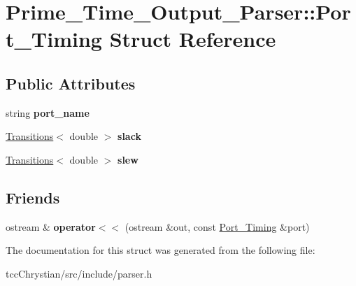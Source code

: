 \hypertarget{structPrime__Time__Output__Parser_1_1Port__Timing}{\section{Prime\-\_\-\-Time\-\_\-\-Output\-\_\-\-Parser\-:\-:Port\-\_\-\-Timing Struct Reference}
\label{structPrime__Time__Output__Parser_1_1Port__Timing}
}
\subsection*{Public Attributes}
\begin{DoxyCompactItemize}
\item 
\hypertarget{structPrime__Time__Output__Parser_1_1Port__Timing_a4c7ae6cb0e76db94fe3b03822ead72c4}{string {\bfseries port\-\_\-name}}\label{structPrime__Time__Output__Parser_1_1Port__Timing_a4c7ae6cb0e76db94fe3b03822ead72c4}

\item 
\hypertarget{structPrime__Time__Output__Parser_1_1Port__Timing_a21231dfc490477789c81e0c9e3e8c18d}{\hyperlink{classTransitions}{Transitions}$<$ double $>$ {\bfseries slack}}\label{structPrime__Time__Output__Parser_1_1Port__Timing_a21231dfc490477789c81e0c9e3e8c18d}

\item 
\hypertarget{structPrime__Time__Output__Parser_1_1Port__Timing_a33e7eb34b63367e3b639999e1cb793bf}{\hyperlink{classTransitions}{Transitions}$<$ double $>$ {\bfseries slew}}\label{structPrime__Time__Output__Parser_1_1Port__Timing_a33e7eb34b63367e3b639999e1cb793bf}

\end{DoxyCompactItemize}
\subsection*{Friends}
\begin{DoxyCompactItemize}
\item 
\hypertarget{structPrime__Time__Output__Parser_1_1Port__Timing_abd555e7dc2c5bfe2b1699915d6b0ca8f}{ostream \& {\bfseries operator$<$$<$} (ostream \&out, const \hyperlink{structPrime__Time__Output__Parser_1_1Port__Timing}{Port\-\_\-\-Timing} \&port)}\label{structPrime__Time__Output__Parser_1_1Port__Timing_abd555e7dc2c5bfe2b1699915d6b0ca8f}

\end{DoxyCompactItemize}


The documentation for this struct was generated from the following file\-:\begin{DoxyCompactItemize}
\item 
tcc\-Chrystian/src/include/parser.\-h\end{DoxyCompactItemize}
